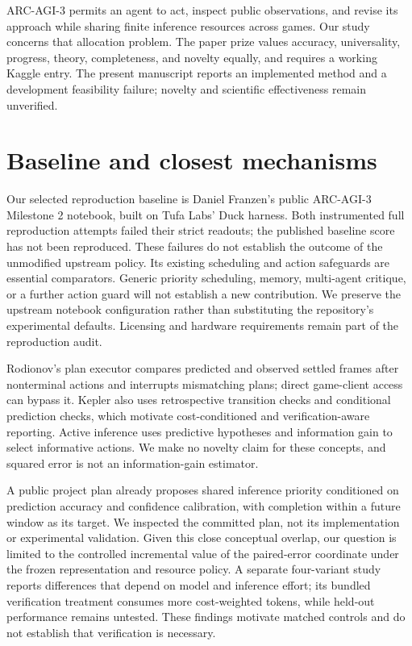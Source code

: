 \documentclass[11pt]{article}
\begin{document}
ARC-AGI-3 permits an agent to act, inspect public observations, and revise its approach while sharing finite inference resources across games. Our study concerns that allocation problem. The paper prize values accuracy, universality, progress, theory, completeness, and novelty equally, and requires a working Kaggle entry\cite{arc2026}. The present manuscript reports an implemented method and a development feasibility failure; novelty and scientific effectiveness remain unverified.

\section{Baseline and closest mechanisms}
Our selected reproduction baseline is Daniel Franzen's public ARC-AGI-3 Milestone 2 notebook\cite{franzen}, built on Tufa Labs' Duck harness\cite{duck}. Both instrumented full reproduction attempts failed their strict readouts; the published baseline score has not been reproduced. These failures do not establish the outcome of the unmodified upstream policy. Its existing scheduling and action safeguards are essential comparators. Generic priority scheduling, memory, multi-agent critique, or a further action guard will not establish a new contribution. We preserve the upstream notebook configuration rather than substituting the repository's experimental defaults. Licensing and hardware requirements remain part of the reproduction audit.

Rodionov's plan executor compares predicted and observed settled frames after nonterminal actions and interrupts mismatching plans; direct game-client access can bypass it\cite{rodionov}. Kepler also uses retrospective transition checks and conditional prediction checks, which motivate cost-conditioned and verification-aware reporting\cite{kepler}. Active inference uses predictive hypotheses and information gain to select informative actions\cite{activeinference}. We make no novelty claim for these concepts, and squared error is not an information-gain estimator.

A public project plan already proposes shared inference priority conditioned on prediction accuracy and confidence calibration, with completion within a future window as its target\cite{dcwplan}. We inspected the committed plan, not its implementation or experimental validation. Given this close conceptual overlap, our question is limited to the controlled incremental value of the paired-error coordinate under the frozen representation and resource policy. A separate four-variant study reports differences that depend on model and inference effort; its bundled verification treatment consumes more cost-weighted tokens, while held-out performance remains untested\cite{rodionovablation}. These findings motivate matched controls and do not establish that verification is necessary.
\end{document}
